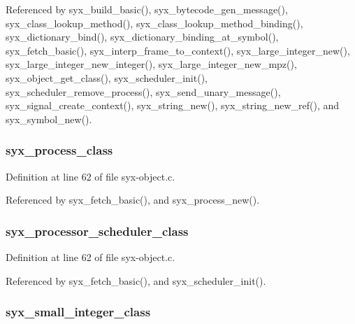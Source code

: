 Referenced by syx\_\-build\_\-basic(), syx\_\-bytecode\_\-gen\_\-message(), syx\_\-class\_\-lookup\_\-method(), syx\_\-class\_\-lookup\_\-method\_\-binding(), syx\_\-dictionary\_\-bind(), syx\_\-dictionary\_\-binding\_\-at\_\-symbol(), syx\_\-fetch\_\-basic(), syx\_\-interp\_\-frame\_\-to\_\-context(), syx\_\-large\_\-integer\_\-new(), syx\_\-large\_\-integer\_\-new\_\-integer(), syx\_\-large\_\-integer\_\-new\_\-mpz(), syx\_\-object\_\-get\_\-class(), syx\_\-scheduler\_\-init(), syx\_\-scheduler\_\-remove\_\-process(), syx\_\-send\_\-unary\_\-message(), syx\_\-signal\_\-create\_\-context(), syx\_\-string\_\-new(), syx\_\-string\_\-new\_\-ref(), and syx\_\-symbol\_\-new().\hypertarget{syx-object_8c_0d597252f524ea69dd0bf8f33b3cec01}{
\subsubsection{ {\bf syx\_\-process\_\-class}}}
\label{syx-object_8c_0d597252f524ea69dd0bf8f33b3cec01}




Definition at line 62 of file syx-object.c.

Referenced by syx\_\-fetch\_\-basic(), and syx\_\-process\_\-new().\hypertarget{syx-object_8c_cc2d7608228c4fd75d822841f0f32125}{
\subsubsection{ {\bf syx\_\-processor\_\-scheduler\_\-class}}}
\label{syx-object_8c_cc2d7608228c4fd75d822841f0f32125}




Definition at line 62 of file syx-object.c.

Referenced by syx\_\-fetch\_\-basic(), and syx\_\-scheduler\_\-init().\hypertarget{syx-object_8c_8b85a92f613df230370e74484940158c}{
\subsubsection{ {\bf syx\_\-small\_\-integer\_\-class}}}
\label{syx-object_8c_8b85a92f613df230370e74484940158c}




